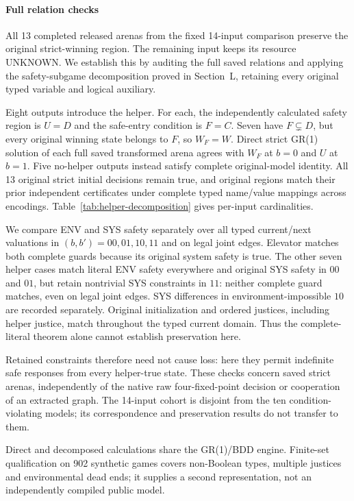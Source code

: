 \paragraph{Full relation checks}
All 13 completed released arenas from the fixed 14-input comparison
preserve the original strict-winning region. The remaining input keeps
its resource UNKNOWN. We establish this by auditing the full saved
relations and applying the safety-subgame decomposition proved in Section~L, retaining
every original typed variable and logical auxiliary.

Eight outputs introduce the helper. For each, the independently calculated
safety region is $U=D$ and the safe-entry condition is $F=C$.
Seven have $F\subsetneq D$, but every original winning state belongs
to $F$, so $W_F=W$. Direct strict GR(1) solution of each full saved
transformed arena agrees with $W_F$ at $b=0$ and $U$ at $b=1$.
Five no-helper outputs instead satisfy complete original-model identity.
All 13 original strict initial decisions remain true, and original
regions match their prior independent certificates under complete
typed name/value mappings across encodings.
Table~\ref{tab:helper-decomposition} gives per-input cardinalities.

We compare ENV and SYS safety separately over all typed current/next
valuations in $(b,b')=00,01,10,11$ and on legal joint edges. Elevator
matches both complete guards because its original system safety is true.
The other seven helper cases match literal ENV safety everywhere and
original SYS safety in $00$ and $01$, but retain nontrivial SYS constraints
in $11$: neither complete guard matches, even on legal joint edges.
SYS differences in environment-impossible $10$ are recorded separately.
Original initialization and ordered justices, including helper justice,
match throughout the typed current domain. Thus the complete-literal
theorem alone cannot establish preservation here.

Retained constraints therefore need not cause loss: here they permit
indefinite safe responses from every helper-true state. These checks
concern saved strict arenas, independently of the native raw
four-fixed-point decision or cooperation of an extracted graph.
The 14-input cohort is disjoint from the ten condition-violating models;
its correspondence and preservation results do not transfer to them.

Direct and decomposed calculations share the GR(1)/BDD engine. Finite-set qualification on 902 synthetic games covers non-Boolean types, multiple justices and environmental dead ends; it supplies a second representation, not an independently compiled public model.


